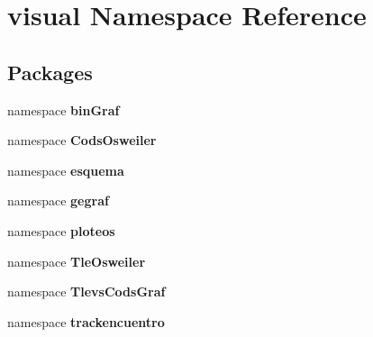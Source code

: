 \section{visual \-Namespace \-Reference}
\label{namespacevisual}
\subsection*{\-Packages}
\begin{DoxyCompactItemize}
\item 
namespace {\bf bin\-Graf}
\item 
namespace {\bf \-Cods\-Osweiler}
\item 
namespace {\bf esquema}
\item 
namespace {\bf gegraf}
\item 
namespace {\bf ploteos}
\item 
namespace {\bf \-Tle\-Osweiler}
\item 
namespace {\bf \-Tlevs\-Cods\-Graf}
\item 
namespace {\bf trackencuentro}
\end{DoxyCompactItemize}
